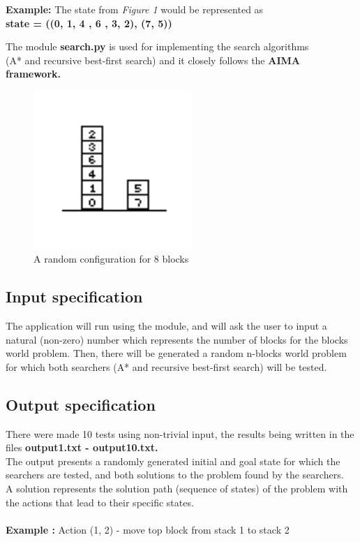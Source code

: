 \documentclass{article}
\begin{document}
    \textbf{Example:} The state from \textit{Figure 1} would be represented as \\
    \textbf{state = ((0, 1, 4 , 6 , 3, 2), (7, 5))}
    
    The module \textbf{search.py} is used for implementing the search algorithms \\ (A* and recursive best-first search) and it closely follows the \textbf{AIMA framework.}
    
    \begin{figure}[t]
    \caption{A random configuration for 8 blocks}
    \includegraphics[width=6cm]{blocks}
    \centering
    \end{figure}
    
\subsection{\textbf{Input specification}}
The application will run using the  module, and will ask the user to input a natural (non-zero) number which represents the number of blocks for the blocks world problem.
Then, there will be generated a random n-blocks world problem for which both searchers (A* and recursive best-first search) will be tested.

\subsection{\textbf{Output specification}}
There were made 10 tests using non-trivial input, the results being written in the files \textbf{output1.txt - output10.txt.}\\
The output presents a randomly generated initial and goal state for which the searchers are tested, and both solutions to the problem found by the searchers.\\
A solution represents the solution path (sequence of states) of the problem with the actions that lead to their specific states.\\
\\
\textbf{Example :} Action (1, 2) - move top block from stack 1 to stack 2 
\end{document}
